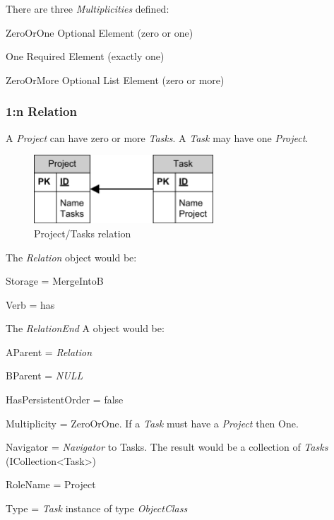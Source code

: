 There are three \emph{Multiplicities} defined:
\begin{descriptionBorder}
	\item[ZeroOrOne] { Optional Element (zero or one) }
	\item[One] { Required Element (exactly one) }
	\item[ZeroOrMore] { Optional List Element (zero or more) }
\end{descriptionBorder}

\subsubsection{1:n Relation}
A \emph{Project} can have zero or more \emph{Tasks}. A \emph{Task} may have one \emph{Project}.

\begin{figure}[ht]
	\begin{center}
		\includegraphics[width=0.6\textwidth]{images/Rel_1_n_Project_Tasks.png}
		\caption{Project/Tasks relation}
		\label{project_tasks_relation}
	\end{center}
\end{figure}

The \emph{Relation} object would be:
\begin{descriptionBorder}
	\item[Storage] 		{ = MergeIntoB }
	\item[Verb] 		{ = has }
\end{descriptionBorder}

The \emph{RelationEnd} A object would be:
\begin{descriptionBorder}
	\item[AParent] { = \emph{Relation}  }
	\item[BParent] { = \emph{NULL} }
	\item[HasPersistentOrder] { = false  }
	\item[Multiplicity] { = ZeroOrOne. If a \emph{Task} must have a \emph{Project} then One. }
	\item[Navigator] { = \emph{Navigator} to Tasks. The result would be a collection of \emph{Tasks} (ICollection\textless Task\textgreater) }
	\item[RoleName] { = Project }
	\item[Type] { = \emph{Task} instance of type \emph{ObjectClass} }
\end{descriptionBorder}

